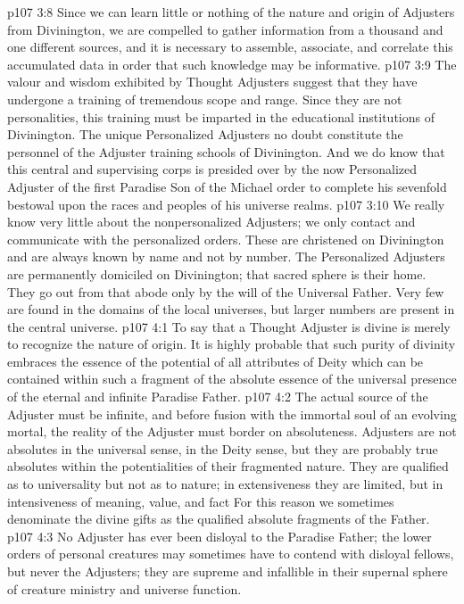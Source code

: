 \vs p107 3:8 Since we can learn little or nothing of the nature and origin of Adjusters from Divinington, we are compelled to gather information from a thousand and one different sources, and it is necessary to assemble, associate, and correlate this accumulated data in order that such knowledge may be informative.
\vs p107 3:9 The valour and wisdom exhibited by Thought Adjusters suggest that they have undergone a training of tremendous scope and range. Since they are not personalities, this training must be imparted in the educational institutions of Divinington. The unique Personalized Adjusters no doubt constitute the personnel of the Adjuster training schools of Divinington. And we do know that this central and supervising corps is presided over by the now Personalized Adjuster of the first Paradise Son of the Michael order to complete his sevenfold bestowal upon the races and peoples of his universe realms.
\vs p107 3:10 We really know very little about the nonpersonalized Adjusters; we only contact and communicate with the personalized orders. These are christened on Divinington and are always known by name and not by number. The Personalized Adjusters are permanently domiciled on Divinington; that sacred sphere is their home. They go out from that abode only by the will of the Universal Father. Very few are found in the domains of the local universes, but larger numbers are present in the central universe.
\vs p107 4:1 To say that a Thought Adjuster is divine is merely to recognize the nature of origin. It is highly probable that such purity of divinity embraces the essence of the potential of all attributes of Deity which can be contained within such a fragment of the absolute essence of the universal presence of the eternal and infinite Paradise Father.
\vs p107 4:2 The actual source of the Adjuster must be infinite, and before fusion with the immortal soul of an evolving mortal, the reality of the Adjuster must border on absoluteness. Adjusters are not absolutes in the universal sense, in the Deity sense, but they are probably true absolutes within the potentialities of their fragmented nature. They are qualified as to universality but not as to nature; in extensiveness they are limited, but in intensiveness of meaning, value, and fact  For this reason we sometimes denominate the divine gifts as the qualified absolute fragments of the Father.
\vs p107 4:3 No Adjuster has ever been disloyal to the Paradise Father; the lower orders of personal creatures may sometimes have to contend with disloyal fellows, but never the Adjusters; they are supreme and infallible in their supernal sphere of creature ministry and universe function.
